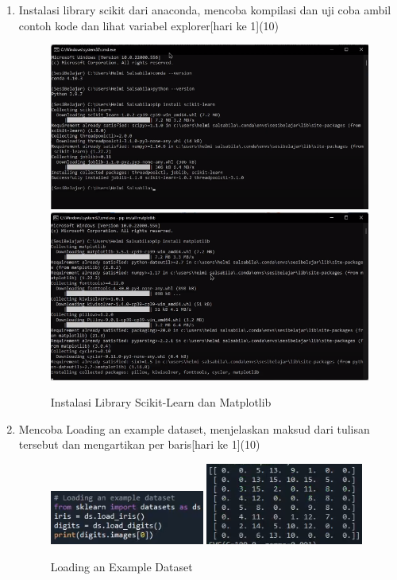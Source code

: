 \begin{enumerate}
\item
Instalasi library scikit dari anaconda, mencoba kompilasi dan uji coba ambil contoh kode dan lihat variabel explorer[hari ke 1](10)

\begin{figure}[ht]
    \centerline{\includegraphics[scale=0.38]{images/Chapter1/Chapter1a.png}
    \includegraphics[scale=0.38]{images/Chapter1/Chapter1b.png}}
    \caption{Instalasi Library Scikit-Learn dan Matplotlib}
    \label{Instalasi Library Scikit-Learn dan Matplotlib}
\end{figure}

\item
Mencoba Loading an example dataset, menjelaskan maksud dari tulisan tersebut dan mengartikan per baris[hari ke 1](10)

\begin{figure}[ht]
\centerline{\includegraphics[scale=1]{images/Chapter1/Chapter1c.png}
    \includegraphics[scale=1]{images/Chapter1/Chapter1ca.png}}
    \caption{Loading an Example Dataset}
    \label{Loading an Example Dataset}
\end{figure}


\end{enumerate}
